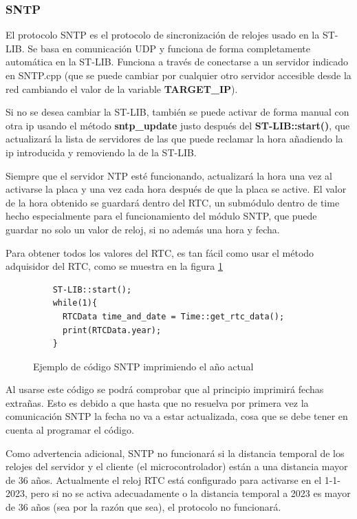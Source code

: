 \documentclass{report}
\begin{document}
\subsubsection{SNTP}
El protocolo SNTP es el protocolo de sincronización de relojes usado en la ST-LIB. Se basa en comunicación UDP y funciona de forma completamente automática en la ST-LIB. Funciona a través de conectarse a un servidor indicado en SNTP.cpp (que se puede cambiar por cualquier otro servidor accesible desde la red cambiando el valor de la variable \textbf{TARGET\_IP}). \par 
Si no se desea cambiar la ST-LIB, también se puede activar de forma manual con otra ip usando el método \textbf{sntp\_update} justo después del \textbf{ST-LIB::start()}, que actualizará la lista de servidores de las que puede reclamar la hora añadiendo la ip introducida y removiendo la de la ST-LIB. 
\par \vspace{0.3cm}
Siempre que el servidor NTP esté funcionando, actualizará la hora una vez al activarse la placa y una vez cada hora después de que la placa se active. El valor de la hora obtenido se guardará dentro del RTC, un submódulo dentro de time hecho especialmente para el funcionamiento del módulo SNTP, que puede guardar no solo un valor de reloj, si no además una hora y fecha. 
\par \vspace{0.3cm}
Para obtener todos los valores del RTC, es tan fácil como usar el método adquisidor del RTC, como se muestra en la figura \ref{SNTPCode}

\begin{figure}[H]
  \begin{lstlisting}
    ST-LIB::start();
    while(1){
      RTCData time_and_date = Time::get_rtc_data();
      print(RTCData.year);
    }
  \end{lstlisting}
  \caption{Ejemplo de código SNTP imprimiendo el año actual}
  \label{SNTPCode}
\end{figure}
\par \vspace{0.3cm}
Al usarse este código se podrá comprobar que al principio imprimirá fechas extrañas. Esto es debido a que hasta que no resuelva por primera vez la comunicación SNTP la fecha no va a estar actualizada, cosa que se debe tener en cuenta al programar el código. 
\par 
Como advertencia adicional, SNTP no funcionará si la distancia temporal de los relojes del servidor y el cliente (el microcontrolador) están a una distancia mayor de 36 años. Actualmente el reloj RTC está configurado para activarse en el 1-1-2023, pero si no se activa adecuadamente o la distancia temporal a 2023 es mayor de 36 años (sea por la razón que sea), el protocolo no funcionará. 
\end{document}
